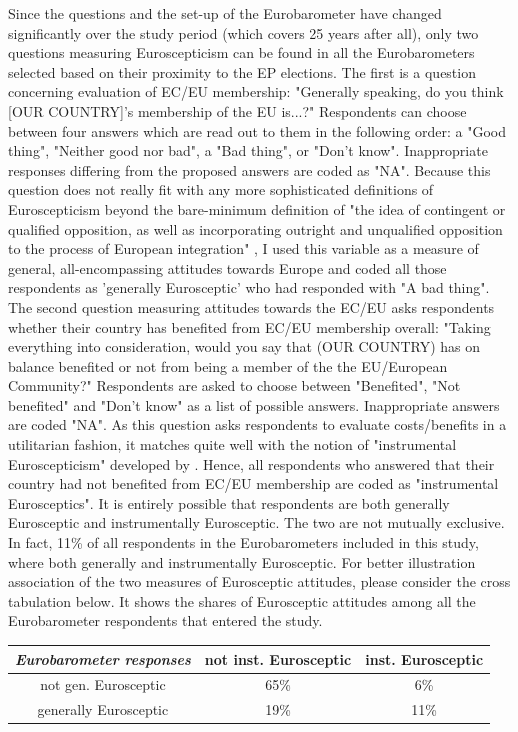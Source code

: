 Since the questions and the set-up of the Eurobarometer have changed significantly over the  study period (which covers 25 years after all), only two questions measuring Euroscepticism can be found in all the Eurobarometers selected based on their proximity to the EP elections. The first is a question concerning evaluation of EC/EU membership: "Generally speaking, do you think [OUR COUNTRY]'s membership of the EU is...?" Respondents can choose between four answers which are read out to them in the following order: a "Good thing", "Neither good nor bad", a "Bad thing", or "Don't know". Inappropriate responses differing from the proposed answers are coded as "NA". Because this question does not really fit with any more sophisticated definitions of Euroscepticism beyond the bare-minimum definition of "the idea of contingent or qualified opposition, as well as incorporating outright and unqualified opposition to the process of European integration" \cite[p.~366]{Taggart1998}, I used this variable as a measure of general, all-encompassing attitudes towards Europe and coded all those respondents as 'generally Eurosceptic' who had responded with "A bad thing".
The second question measuring attitudes towards the EC/EU asks respondents whether their country has benefited from EC/EU membership overall: "Taking everything into consideration, would you say that (OUR COUNTRY) has on balance benefited or not from being a member of the the EU/European Community?" Respondents are asked to choose between "Benefited", "Not benefited" and "Don't know" as a list of possible answers. Inappropriate answers are coded "NA". As this question asks respondents to evaluate costs/benefits in a utilitarian fashion, it matches quite well with the notion of "instrumental Euroscepticism" developed by . Hence, all respondents who answered that their country had not benefited from EC/EU membership are coded as "instrumental Eurosceptics". It is entirely possible that respondents are both generally Eurosceptic and instrumentally Eurosceptic. The two are not mutually exclusive. In fact, 11\% of all respondents in the Eurobarometers included in this study, where both generally and instrumentally Eurosceptic. For better illustration association of the two measures of Eurosceptic attitudes, please consider the cross tabulation below. It shows the shares of Eurosceptic attitudes among all the Eurobarometer respondents that entered the study.

\begin{tabular}{|c|c|c|}
	\hline {\emph{Eurobarometer responses}} & not inst. Eurosceptic & inst. Eurosceptic \\ 
	\hline not gen. Eurosceptic & 65\% & 6\%  \\ 
	\hline generally Eurosceptic & 19\% & 11\% \\ 
	\hline 
\end{tabular} 

